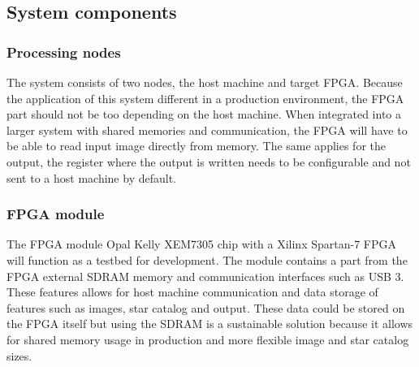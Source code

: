 \documentclass[12pt]{report}
\begin{document}
\subsection{System components}
\subsubsection{Processing nodes}
The system consists of two nodes, the host machine and target FPGA. Because the application of this system different in a production environment, the FPGA part should not be too depending on the host machine. When integrated into a larger system with shared memories and communication, the FPGA will have to be able to read input image directly from memory. The same applies for the output, the register where the output is written needs to be configurable and not sent to a host machine by default.

\subsubsection{FPGA module}
The FPGA module Opal Kelly XEM7305 chip with a Xilinx Spartan-7 FPGA will function as a testbed for development. The module contains a part from the FPGA external SDRAM memory and communication interfaces such as USB 3. These features allows for host machine communication and data storage of features such as images, star catalog and output. These data could be stored on the FPGA itself but using the SDRAM is a sustainable solution because it allows for shared memory usage in production and more flexible image and star catalog sizes.


\end{document}
